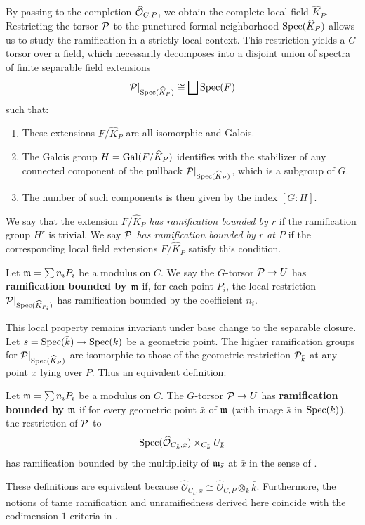 By passing to the completion $\widehat{\mathcal{O}}_{C,P}$, we obtain the complete local field $\widehat{K}_P$.
Restricting the torsor $\mathcal{P}$ to the punctured formal neighborhood $\operatorname{Spec}(\widehat{K}_P)$
 allows us to study the ramification in a strictly local context.
 This restriction yields a $G$-torsor over a field, which necessarily decomposes into a disjoint union of spectra of finite separable field extensions
 $$ \mathcal{P}|_{\operatorname{Spec}(\widehat{K}_P)} \cong \bigsqcup \operatorname{Spec}(F) $$
 such that:
 \begin{enumerate}
    \item These extensions $F/\widehat{K}_P$ are all isomorphic and Galois.
    \item The Galois group $H = \operatorname{Gal}(F/\widehat{K}_P)$ identifies with the stabilizer of any connected component of the pullback $\mathcal{P}|_{\operatorname{Spec}(\widehat{K}_P)}$,
     which is a subgroup of $G$.
    \item  The number of such components is then given by the index $[G:H]$.
 \end{enumerate}

 \begin{definition}\label{definition:local_ramification_boundness}
    We say that the extension $F/\widehat{K}_P$ \textit{has ramification bounded by $r$} if the ramification group $H^r$ is trivial.
    We say \textit{$\mathcal{P}$ has ramification bounded by $r$ at $P$} if the corresponding local field extensions $F/\widehat{K}_P$
    satisfy this condition.
 \end{definition}


\begin{definition}
    Let $\mathfrak{m} = \sum n_i P_i$ be a modulus on $C$. We say the $G$-torsor $\mathcal{P} \to U$ has
    \textbf{ramification bounded by $\mathfrak{m}$} if, for each point $P_i$, the local restriction
    $\mathcal{P}|_{\operatorname{Spec}(\widehat{K}_{P_i})}$ has ramification bounded by the coefficient $n_i$.
\end{definition}

This local property remains invariant under base change to the separable closure.
Let $\bar{s} = \operatorname{Spec}(\bar{k}) \to \operatorname{Spec}(k)$
be a geometric point.
The higher ramification groups for $\mathcal{P}|_{\operatorname{Spec}(\widehat{K}_P)}$ are isomorphic to those of
the geometric restriction $\mathcal{P}_{\bar{k}}$ at any point $\bar{x}$ lying over $P$.
Thus an equivalent definition:
\begin{definition}
    Let $\mathfrak{m} = \sum n_i P_i$ be a modulus on $C$.
    The $G$-torsor $\mathcal{P} \to U$ has \textbf{ramification bounded by $\mathfrak{m}$}
    if for every geometric point $\bar{x}$ of $\mathfrak{m}$ (with image $\bar{s}$ in $\operatorname{Spec}(k)$),
    the restriction of $\mathcal{P}$ to$$ \operatorname{Spec}(\widehat{\mathcal{O}}_{C_{\bar{k}},\bar{x}}) \times_{C_{\bar{k}}} U_{\bar{k}} $$
    has ramification bounded by the multiplicity of $\mathfrak{m}_{\bar{s}}$ at $\bar{x}$ in the sense of
    .
\end{definition}
These definitions are equivalent because $\widehat{\mathcal{O}}_{C_{\bar{k}},\bar{x}} \cong \widehat{\mathcal{O}}_{C,P} \otimes_k \bar{k}$. Furthermore, the notions of tame ramification and unramifiedness derived here coincide with the codimension-$1$ criteria in .

